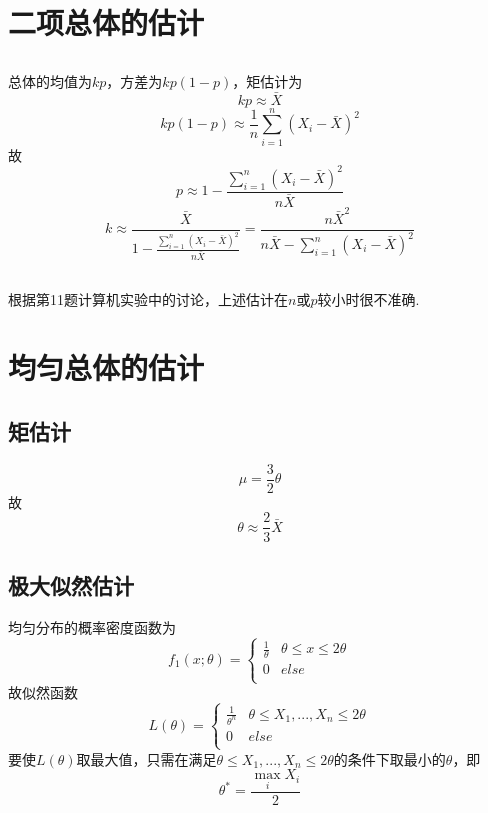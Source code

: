 \documentclass{article}
\begin{document}
\begin{CJK}{UTF8}{gbsn}
\section{二项总体的估计}
\subsection{}
总体的均值为$kp$，方差为$kp(1-p)$，矩估计为
$$ kp\approx \bar{X}$$
$$ kp(1-p)\approx \frac{1}{n}\sum\limits_{i=1}^{n}(X_{i}-\bar{X})^{2}$$
故
$$ p\approx 1-\frac{\sum\limits_{i=1}^{n}(X_{i}-\bar{X})^{2}}{n\bar{X}}$$
$$ k\approx \frac{\bar{X}}{1-\frac{\sum\limits_{i=1}^{n}(X_{i}-\bar{X})^{2}}{n\bar{X}}}=\frac{n\bar{X}^{2}}{n\bar{X}-\sum\limits_{i=1}^{n}(X_{i}-\bar{X})^{2}}$$
\subsection{}
根据第11题计算机实验中的讨论，上述估计在$n$或$p$较小时很不准确.
\section{均匀总体的估计}
\subsection{矩估计}
$$\mu=\frac{3}{2}\theta$$
故
$$\theta\approx\frac{2}{3}\bar{X}$$
\subsection{极大似然估计}
均匀分布的概率密度函数为
\begin{equation}
    f_{1}(x;\theta)=\left\{
    \begin{array}{cl}
    \frac{1}{\theta} & \theta\leq x\leq 2\theta\\
    0 & else\\
    \end{array}\right.
\end{equation}
故似然函数
\begin{equation}
    L(\theta)=\left\{
    \begin{array}{cl}
    \frac{1}{\theta^{n}} & \theta\leq X_{1},...,X_{n}\leq 2\theta\\
    0 & else\\
    \end{array}\right.
\end{equation}
要使$L(\theta)$取最大值，只需在满足$\theta\leq X_{1},...,X_{n}\leq 2\theta$的条件下取最小的$\theta$，即
$$\theta^{*} = \frac{\max\limits_{i}X_{i}}{2}$$

\end{CJK}
\end{document}
